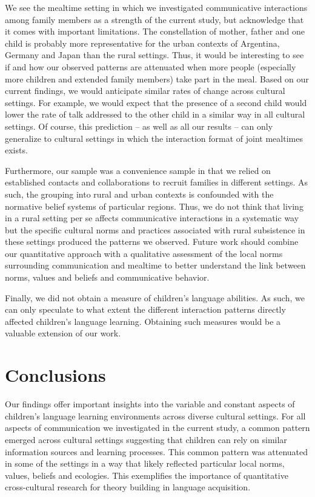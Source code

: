 \documentclass[
  man,floatsintext]{apa6}
\begin{document}
We see the mealtime setting in which we investigated communicative interactions among family members as a strength of the current study, but acknowledge that it comes with important limitations. The constellation of mother, father and one child is probably more representative for the urban contexts of Argentina, Germany and Japan than the rural settings. Thus, it would be interesting to see if and how our observed patterns are attenuated when more people (especially more children and extended family members) take part in the meal. Based on our current findings, we would anticipate similar rates of change across cultural settings. For example, we would expect that the presence of a second child would lower the rate of talk addressed to the other child in a similar way in all cultural settings. Of course, this prediction -- as well as all our results -- can only generalize to cultural settings in which the interaction format of joint mealtimes exists.

Furthermore, our sample was a convenience sample in that we relied on established contacts and collaborations to recruit families in different settings. As such, the grouping into rural and urban contexts is confounded with the normative belief systems of particular regions. Thus, we do not think that living in a rural setting per se affects communicative interactions in a systematic way but the specific cultural norms and practices associated with rural subsistence in these settings produced the patterns we observed. Future work should combine our quantitative approach with a qualitative assessment of the local norms surrounding communication and mealtime to better understand the link between norms, values and beliefs and communicative behavior.

Finally, we did not obtain a measure of children's language abilities. As such, we can only speculate to what extent the different interaction patterns directly affected children's language learning. Obtaining such measures would be a valuable extension of our work.

\hypertarget{conclusions}{%
\section{Conclusions}\label{conclusions}}

Our findings offer important insights into the variable and constant aspects of children's language learning environments across diverse cultural settings. For all aspects of communication we investigated in the current study, a common pattern emerged across cultural settings suggesting that children can rely on similar information sources and learning processes. This common pattern was attenuated in some of the settings in a way that likely reflected particular local norms, values, beliefs and ecologies. This exemplifies the importance of quantitative cross-cultural research for theory building in language acquisition.
\end{document}
